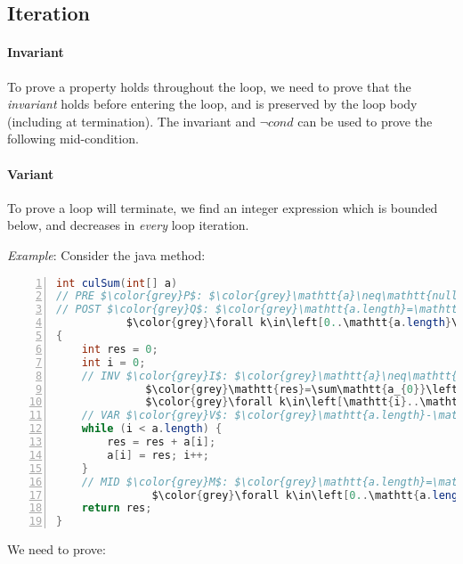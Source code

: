 \documentclass[10pt,twoside,twocolumn]{article}
\begin{document}
\subsection{Iteration}


\paragraph{Invariant}

To prove a property holds throughout the loop, we need to prove that
the \emph{invariant} holds before entering the loop, and is preserved
by the loop body (including at termination). The invariant and $\lnot cond$
can be used to prove the following mid-condition.


\paragraph{Variant}

To prove a loop will terminate, we find an integer expression which
is bounded below, and decreases in \emph{every} loop iteration.

\emph{Example}: Consider the java method:
\begin{lstlisting}[language=Java,numbers=left,numberstyle={\footnotesize},basicstyle={\small\ttfamily},tabsize=4,mathescape=true,xleftmargin={5.0ex},commentstyle={\color{grey}}]
int culSum(int[] a)
// PRE $\color{grey}P$: $\color{grey}\mathtt{a}\neq\mathtt{null}$
// POST $\color{grey}Q$: $\color{grey}\mathtt{a.length}=\mathtt{a_{0}.length}\land\mathtt{r}=\sum\mathtt{a_{0}}\left[0..\mathtt{a.length}\right)\land$
	       $\color{grey}\forall k\in\left[0..\mathtt{a.length}\right).\left[\mathtt{a[}k\mathtt{]}=\sum\mathtt{a}_{\mathtt{0}}\left[0..k+1\right)\right]$
{
	int res = 0;
	int i = 0;
	// INV $\color{grey}I$: $\color{grey}\mathtt{a}\neq\mathtt{null}\land\mathtt{a.length}=\mathtt{a_{0}.length}\land0\leq\mathtt{i}\leq\mathtt{a.length}\land$
			  $\color{grey}\mathtt{res}=\sum\mathtt{a_{0}}\left[0..\mathtt{i}\right)\land\forall k\in\left[0..\mathtt{i}\right).\left[\mathtt{a[}k\mathtt{]}=\sum\mathtt{a_{0}}\left[0..k+1\right)\right]\land$
			  $\color{grey}\forall k\in\left[\mathtt{i}..\mathtt{a.length}\right).\left[\mathtt{a[}k\mathtt{]}=\mathtt{a_{0}[}k\mathtt{]}\right]$
	// VAR $\color{grey}V$: $\color{grey}\mathtt{a.length}-\mathtt{i}$
	while (i < a.length) {
		res = res + a[i];
		a[i] = res; i++;
	}
	// MID $\color{grey}M$: $\color{grey}\mathtt{a.length}=\mathtt{a_{0}.length}\land\mathtt{res}=\sum\mathtt{a_{0}\left[0..\mathtt{a.length}\right)}\land$
		  	   $\color{grey}\forall k\in\left[0..\mathtt{a.length}\right).\left[\mathtt{a[}k\mathtt{]}=\sum\mathtt{a}_{\mathtt{0}}\left[0..k+1\right)\right]$
	return res;
}
\end{lstlisting}
We need to prove:
\end{document}
